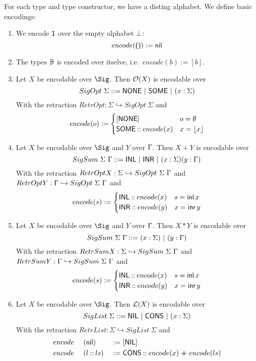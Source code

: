 For each type and type constructor, we have a disting alphabet.  We define basic encodings:
\begin{definition}
  \begin{enumerate}
  \item We encode $\textsf{1}$ over the empty alphabet $\bot$:
  \[ encode(\textsf{()}) := \textsf{nil}
  \]
  \item The types $\mathbb{B}$ is encoded over itselve, i.e.\ $encode(b):=[b]$.
  \item Let $X$ be encodable over $\Sig$.  Then $\mathcal{O}(X)$ is encodable over
    \[ SigOpt~\Sigma ::= \textsf{NONE} ~|~ \textsf{SOME} ~|~ (x:\Sigma) \]
    With the retraction $RetrOpt : \Sigma \hookrightarrow SigOpt~\Sigma$ and
    \[
      encode(o) :=
      \begin{cases}
        [\textsf{NONE}] & o=\emptyset \\
        \textsf{SOME} \mathbin{::} encode(x) & x=\left\lfloor {x} \right\rfloor
      \end{cases}
    \]
  \item Let $X$ be encodable over $\Sig$ and $Y$ over $\Gamma$.  Then $X+Y$ is encodable over
    \[ SigSum~\Sigma~\Gamma ::= \textsf{INL} ~|~ \textsf{INR} ~|~ (x:\Sigma) (y:\Gamma) \] With the retraction
    $RetrOptX : \Sigma \hookrightarrow SigOpt~\Sigma~\Gamma$ and $RetrOptY : \Gamma \hookrightarrow SigOpt~\Sigma~\Gamma$ and
    \[
      encode(s) :=
      \begin{cases}
        \textsf{INL} \mathbin{::} encode(x) & s=\operatorname{\textsf{inl}} x \\
        \textsf{INR} \mathbin{::} encode(y) & x=\operatorname{\textsf{inr}} y
      \end{cases}
    \]
  \item Let $X$ be encodable over $\Sig$ and $Y$ over $\Gamma$.  Then $X*Y$ is encodable over
    \[ SigSum~\Sigma~\Gamma ::= (x:\Sigma) ~|~ (y:\Gamma) \] With the retraction
    $RetrSumX : \Sigma \hookrightarrow SigSum~\Sigma~\Gamma$ and $RetrSumY : \Gamma \hookrightarrow SigSum~\Sigma~\Gamma$ and
    \[
      encode(s) :=
      \begin{cases}
        \textsf{INL} \mathbin{::} encode(x) & s=\operatorname{\textsf{inl}} x \\
        \textsf{INR} \mathbin{::} encode(y) & x=\operatorname{\textsf{inr}} y
      \end{cases}
    \]
  \item Let $X$ be encodable over $\Sig$.  Then $\mathcal{L}(X)$ is encodable over
    \[ SigList~\Sigma ::= \textsf{NIL} ~|~ \textsf{CONS} ~|~ (x:\Sigma) \]
    With the retraction $RetrList : \Sigma \hookrightarrow SigList~\Sigma$ and
    \begin{alignat*}{3}
      &encode~&&(\textsf{nil}      ) &~:=~& [\textsf{NIL}] \\
      &encode~&&(l \mathbin{::} ls) &~:=~& \textsf{CONS} \mathbin{::} encode(x) \mathbin{+\mkern-10mu+} encode(ls)
    \end{alignat*}
  \end{enumerate}
\end{definition}

